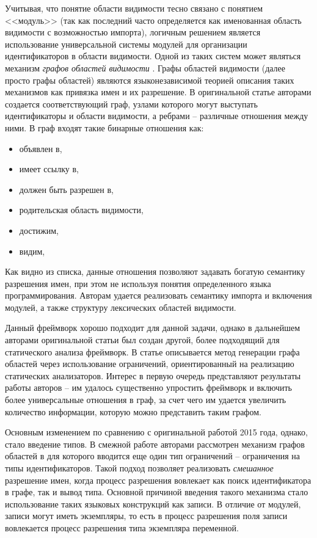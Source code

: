 Учитывая, что понятие области видимости тесно связано с понятием <<модуль>> (так как последний часто определяется
как именованная область видимости с возможностью импорта),
логичным решением является использование универсальной системы модулей для организации идентификаторов в области
видимости. Одной из таких систем может являться механизм \textit{графов областей видимости} \cite{scope-graphs}.
Графы областей видимости (далее просто графы областей) являются языконезависимой теорией описания таких
механизмов как привязка имен и их разрешение. В оригинальной статье авторами создается соответствующий граф,
узлами которого могут выступать идентификаторы и области видимости, а ребрами -- различные отношения между ними. В граф входят
такие бинарные отношения как:
\begin{itemize}
    \item объявлен в,
    \item имеет ссылку в,
    \item должен быть разрешен в,
    \item родительская область видимости,
    \item достижим,
    \item видим,
\end{itemize}

Как видно из списка, данные отношения позволяют задавать богатую семантику разрешения имен, при этом
не используя понятия определенного языка программирования. Авторам удается реализовать семантику
импорта и включения модулей, а также структуру лексических областей видимости.

Данный фреймворк хорошо подходит для данной задачи, однако в дальнейшем авторами оригинальной статьи
был создан другой, более подходящий для статического анализа фреймворк. В статье \cite{scope-graphs-static-analysis}
описывается метод генерации графа областей через использование ограничений, ориентированный на реализацию
статических анализаторов. Интерес в первую очередь представляют результаты работы авторов -- им удалось
существенно упростить фреймворк и включить более универсальные отношения в граф, за счет чего им удается увеличить
количество информации, которую можно представить таким графом. 

Основным изменением по сравнению с оригинальной работой 2015 года, однако, стало введение типов. В смежной работе
\cite{scope-graphs-typed} авторами рассмотрен механизм графов областей в для которого вводится еще один тип
ограничений -- ограничения на типы идентификаторов. Такой подход позволяет реализовать \textit{смешанное} разрешение
имен, когда процесс разрешения вовлекает как поиск идентификатора в графе, так и вывод типа. Основной причиной
введения такого механизма стало использование таких языковых конструкций как записи. В отличие от модулей, записи
могут иметь экземпляры, то есть в процесс разрешения поля записи вовлекается процесс разрешения типа экземпляра переменной.

